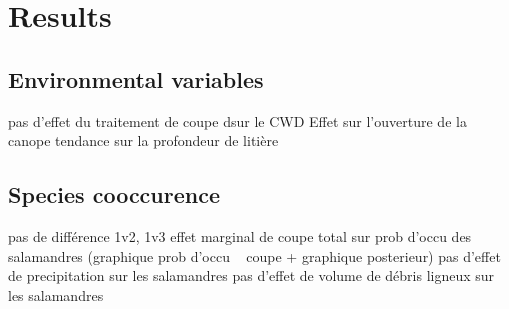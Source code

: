 






\clearpage

\section*{Results}
\label{sec:results1}

\subsection*{Environmental variables}
\label{subsec:ResEnv}

pas d'effet du traitement de coupe dsur le CWD
Effet sur l'ouverture de la canope
tendance sur la profondeur de litière

\subsection*{Species cooccurence}
\label{subsec:ResSpCooc}

pas de différence 1v2, 1v3
effet marginal de coupe total sur prob d'occu des salamandres (graphique prob d'occu ~ coupe + graphique posterieur)
pas d'effet de precipitation sur les salamandres
pas d'effet de volume de débris ligneux sur les salamandres

